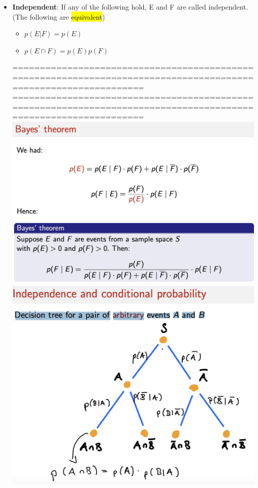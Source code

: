 \documentclass{article}
\begin{document}
\begin{itemize}
\item \textbf{Independent}: If any of the following hold, E and F are called independent.(The following are \hl{equivalent})
\begin{itemize}
\item $p(E | F) = p(E)$
\item $p(E \cap F) = p(E)p(F)$
\end{itemize}


================================================================================================================
\newpage
================================================================================================================\\

 \includegraphics[width=1.0\linewidth]{graph/9.jpg} \\%
\includegraphics[width=1.0\linewidth]{graph/10.jpg} \\%

\end{itemize}
\end{document}
